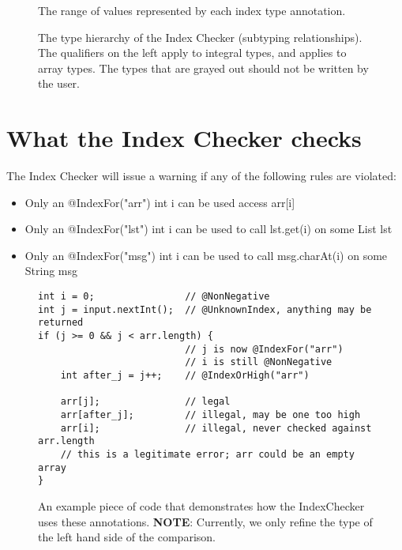 \begin{figure}
\caption{The range of values represented by each index type annotation.}
\label{fig-index-figure}
\end{figure}

\begin{figure}
\caption{The type hierarchy of the Index Checker (subtyping relationships).
The qualifiers on the left apply to integral types, and
 applies to array types.
The types that are grayed out should not be written by the user.}
\label{fig-index-heirarchy}
\end{figure}

\section{What the Index Checker checks\label{index-checks}}

The Index Checker will issue a warning if any of the following rules are violated:
\begin{itemize}
\item Only an @IndexFor("arr") int i can be used access arr[i]
\item Only an @IndexFor("lst") int i can be used to call lst.get(i) on some List lst
\item Only an @IndexFor("msg") int i can be used to call msg.charAt(i) on some String msg
\end{itemize}

\begin{figure}
\begin{Verbatim}
int i = 0;                // @NonNegative
int j = input.nextInt();  // @UnknownIndex, anything may be returned
if (j >= 0 && j < arr.length) {
                          // j is now @IndexFor("arr")
                          // i is still @NonNegative
    int after_j = j++;    // @IndexOrHigh("arr")

    arr[j];               // legal
    arr[after_j];         // illegal, may be one too high
    arr[i];               // illegal, never checked against arr.length
    // this is a legitimate error; arr could be an empty array
}
\end{Verbatim}
\caption{An example piece of code that demonstrates how the IndexChecker uses these annotations. \textbf{NOTE}: Currently, we only refine the type of the left hand side of the comparison.}
\label{fig-index-hierarchy}
\end{figure}


